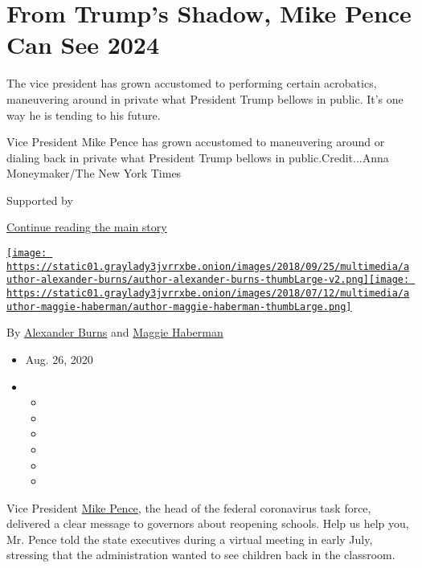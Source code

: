 \hypertarget{from-trumps-shadow-mike-pence-can-see-2024}{%
\section{From Trump's Shadow, Mike Pence Can See
2024}\label{from-trumps-shadow-mike-pence-can-see-2024}}

The vice president has grown accustomed to performing certain
acrobatics, maneuvering around in private what President Trump bellows
in public. It's one way he is tending to his future.

Vice President Mike Pence has grown accustomed to maneuvering around or
dialing back in private what President Trump bellows in
public.Credit...Anna Moneymaker/The New York Times

Supported by

\protect\hyperlink{after-sponsor}{Continue reading the main story}

\href{https://www.nytimes3xbfgragh.onion/by/alexander-burns}{\texttt{[image: https://static01.graylady3jvrrxbe.onion/images/2018/09/25/multimedia/author-alexander-burns/author-alexander-burns-thumbLarge-v2.png]}}\href{https://www.nytimes3xbfgragh.onion/by/maggie-haberman}{\texttt{[image: https://static01.graylady3jvrrxbe.onion/images/2018/07/12/multimedia/author-maggie-haberman/author-maggie-haberman-thumbLarge.png]}}

By
\href{https://www.nytimes3xbfgragh.onion/by/alexander-burns}{Alexander
Burns} and
\href{https://www.nytimes3xbfgragh.onion/by/maggie-haberman}{Maggie
Haberman}

\begin{itemize}
\item
  Aug. 26, 2020
\item
  \begin{itemize}
  \item
  \item
  \item
  \item
  \item
  \item
  \end{itemize}
\end{itemize}

Vice President
\href{https://www.nytimes3xbfgragh.onion/2020/08/26/us/politics/mike-pence-rnc-speech.html}{Mike
Pence}, the head of the federal coronavirus task force, delivered a
clear message to governors about reopening schools. Help us help you,
Mr. Pence told the state executives during a virtual meeting in early
July, stressing that the administration wanted to see children back in
the classroom.

